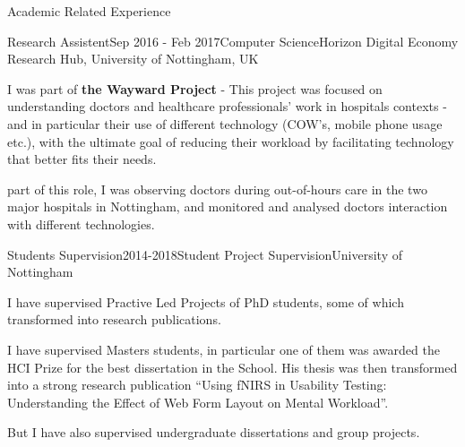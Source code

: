 \documentclass{resume} %
\begin{document}
\begin{rSection}{Academic Related Experience}
	
	\begin{rSubsection}{Research Assistent}{Sep 2016 - Feb 2017}{Computer Science}{Horizon Digital Economy Research Hub, University of Nottingham, UK}
		\item I was part of \textbf{the Wayward Project} -  This project was focused on understanding doctors and healthcare professionals' work in hospitals contexts - and in particular their use of different technology (COW's, mobile phone usage etc.), with the ultimate goal of reducing their workload by facilitating technology that better fits their needs.
		\item part of this role, I was observing doctors during out-of-hours care in the two major hospitals in Nottingham, and monitored and analysed doctors interaction with different technologies.
	\end{rSubsection}	
	
	\begin{rSubsection}{Students Supervision}{2014-2018}{Student Project Supervision}{University of Nottingham}
		\item I have supervised Practive Led Projects of PhD students, some of which transformed into research publications.
		\item I have supervised Masters students, in particular one of them was awarded the HCI Prize for the best dissertation in the School.  His thesis was then transformed into a strong research publication ``Using fNIRS in Usability Testing: Understanding the Effect of Web Form Layout on Mental Workload''.
		\item But I have also supervised undergraduate dissertations and group projects.
    \end{rSubsection}
    \vspace{-1 mm}
    

\end{rSection}
\end{document}
